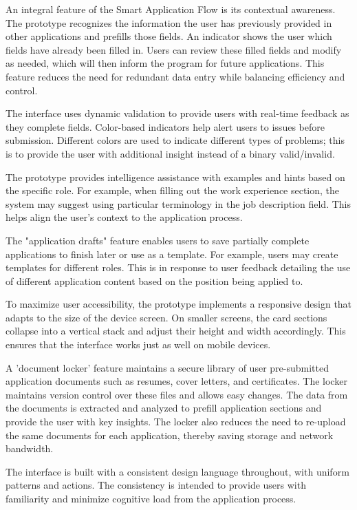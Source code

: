 \documentclass[
	letterpaper, %
]{jdf}
\begin{document}
\begin{sloppypar}
An integral feature of the Smart Application Flow is its contextual awareness. The prototype recognizes the information the user has previously provided in other applications and prefills those fields. An indicator shows the user which fields have already been filled in. Users can review these filled fields and modify as needed, which will then inform the program for future applications. This feature reduces the need for redundant data entry while balancing efficiency and control.

The interface uses dynamic validation to provide users with real-time feedback as they complete fields. Color-based indicators help alert users to issues before submission. Different colors are used to indicate different types of problems; this is to provide the user with additional insight instead of a binary valid/invalid.

The prototype provides intelligence assistance with examples and hints based on the specific role. For example, when filling out the work experience section, the system may suggest using particular terminology in the job description field. This helps align the user's context to the application process.

The "application drafts" feature enables users to save partially complete applications to finish later or use as a template. For example, users may create templates for different roles. This is in response to user feedback detailing the use of different application content based on the position being applied to.

To maximize user accessibility, the prototype implements a responsive design that adapts to the size of the device screen. On smaller screens, the card sections collapse into a vertical stack and adjust their height and width accordingly. This ensures that the interface works just as well on mobile devices.

A 'document locker' feature maintains a secure library of user pre-submitted application documents such as resumes, cover letters, and certificates. The locker maintains version control over these files and allows easy changes. The data from the documents is extracted and analyzed to prefill application sections and provide the user with key insights. The locker also reduces the need to re-upload the same documents for each application, thereby saving storage and network bandwidth.

The interface is built with a consistent design language throughout, with uniform patterns and actions. The consistency is intended to provide users with familiarity and minimize cognitive load from the application process.


\end{sloppypar}
\end{document}
